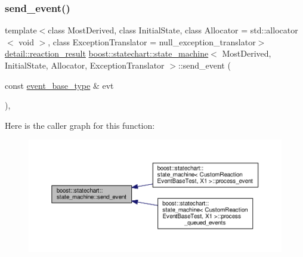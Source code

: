 \mbox{\label{classboost_1_1statechart_1_1state__machine_ae429789fa4f90eecdce95f56fd72f985}} 
\subsubsection{\texorpdfstring{send\+\_\+event()}{send\_event()}}
{\footnotesize\ttfamily template$<$class Most\+Derived, class Initial\+State, class Allocator = std\+::allocator$<$ void $>$, class Exception\+Translator = null\+\_\+exception\+\_\+translator$>$ \\
\mbox{\hyperlink{namespaceboost_1_1statechart_1_1detail_ab091bbb4c29327fb46ee479ea1b7255b}{detail\+::reaction\+\_\+result}} \mbox{\hyperlink{classboost_1_1statechart_1_1state__machine}{boost\+::statechart\+::state\+\_\+machine}}$<$ Most\+Derived, Initial\+State, Allocator, Exception\+Translator $>$\+::send\+\_\+event (\begin{DoxyParamCaption}\item[{const \mbox{\hyperlink{classboost_1_1statechart_1_1state__machine_adb0e98d6d780a0977209fa7389b20bcd}{event\+\_\+base\+\_\+type}} \&}]{evt }\end{DoxyParamCaption})\hspace{0.3cm}{\ttfamily [inline]}, {\ttfamily [private]}}

Here is the caller graph for this function\+:
\nopagebreak
\begin{figure}[H]
\begin{center}
\leavevmode
\includegraphics[width=350pt]{classboost_1_1statechart_1_1state__machine_ae429789fa4f90eecdce95f56fd72f985_icgraph}
\end{center}
\end{figure}
\mbox{\label{classboost_1_1statechart_1_1state__machine_a986877a10c5bbba4fabdd398893f8bda}} 
